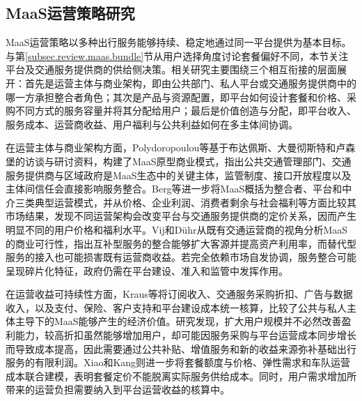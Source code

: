 \subsection{MaaS运营策略研究}\label{subsec.review.promo.operation}

MaaS运营策略以多种出行服务能够持续、稳定地通过同一平台提供为基本目标。与第\ref{subsec.review.maas.bundle}节从用户选择角度讨论套餐偏好不同，本节关注平台及交通服务提供商的供给侧决策。相关研究主要围绕三个相互衔接的层面展开：首先是运营主体与商业架构，即由公共部门、私人平台或交通服务提供商中的哪一方承担整合者角色；其次是产品与资源配置，即平台如何设计套餐和价格、采购不同方式的服务容量并将其分配给用户；最后是价值创造与分配，即平台收入、服务成本、运营商收益、用户福利与公共利益如何在多主体间协调。

在运营主体与商业架构方面，Polydoropoulou等\citep{polydoropoulouPrototypeBusinessModels2020}基于布达佩斯、大曼彻斯特和卢森堡的访谈与研讨资料，构建了MaaS原型商业模式，指出公共交通管理部门、交通服务提供商与区域政府是MaaS生态中的关键主体，监管制度、接口开放程度以及主体间信任会直接影响服务整合。Berg等\citep{vandenbergBusinessModelsMobility2022}进一步将MaaS概括为整合者、平台和中介三类典型运营模式，并从价格、企业利润、消费者剩余与社会福利等方面比较其市场结果，发现不同运营架构会改变平台与交通服务提供商的定价关系，因而产生明显不同的用户价格和福利水平。Vij和D\"uhr\citep{vijCommercialViabilityMobilityasaService2022}从既有交通运营商的视角分析MaaS的商业可行性，指出互补型服务的整合能够扩大客源并提高资产利用率，而替代型服务的接入也可能损害既有运营商收益。若完全依赖市场自发协调，服务整合可能呈现碎片化特征，政府仍需在平台建设、准入和监管中发挥作用。

在运营收益可持续性方面，Kraus等\citep{krausEstimationJointValue2023}将订阅收入、交通服务采购折扣、广告与数据收入，以及支付、保险、客户支持和平台建设成本统一核算，比较了公共与私人主体主导下的MaaS能够产生的经济价值。研究发现，扩大用户规模并不必然改善盈利能力，较高折扣虽然能够增加用户，却可能因服务采购与平台运营成本同步增长而导致成本提高，因此需要通过公共补贴、增值服务和新的收益来源弥补基础出行服务的有限利润。Xiao和Kang\citep{xiaoServiceBundleSizing2025}则进一步将套餐额度与价格、弹性需求和车队运营成本联合建模，表明套餐定价不能脱离实际服务供给成本。同时，用户需求增加所带来的运营负担需要纳入到平台运营收益的核算中。

